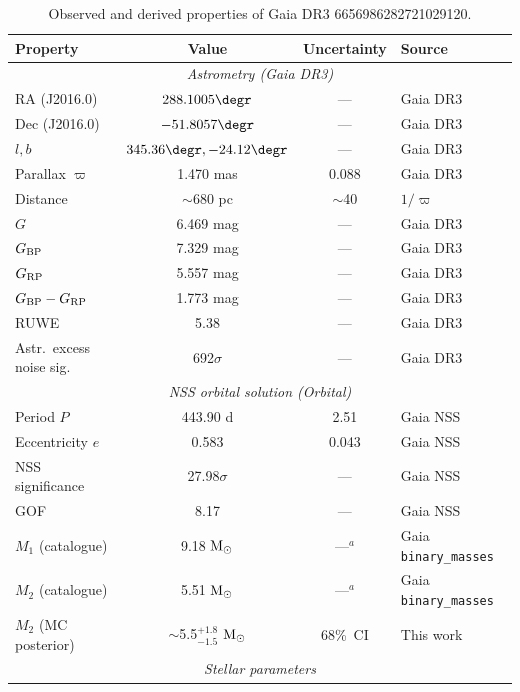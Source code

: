 \documentclass[usenatbib,fleqn]{mnras}
\newcommand{\Msun}{{\rm M}_\odot}
\begin{document}
\begin{table}
\centering
\caption{Observed and derived properties of
Gaia DR3 6656986282721029120.}
\label{tab:observed}
\begin{tabular}{lccl}
\toprule
Property & Value & Uncertainty & Source \\
\midrule
\multicolumn{4}{c}{\textit{Astrometry (Gaia DR3)}} \\
RA (J2016.0)           & $288.1005\degr$      & ---      & Gaia DR3 \\
Dec (J2016.0)          & $-51.8057\degr$      & ---      & Gaia DR3 \\
$l, b$                 & $345.36\degr, -24.12\degr$ & --- & Gaia DR3 \\
Parallax $\varpi$      & 1.470 mas            & 0.088    & Gaia DR3 \\
Distance               & $\sim$680 pc         & $\sim$40 & $1/\varpi$ \\
$G$                    & 6.469 mag            & ---      & Gaia DR3 \\
$G_{\rm BP}$           & 7.329 mag            & ---      & Gaia DR3 \\
$G_{\rm RP}$           & 5.557 mag            & ---      & Gaia DR3 \\
$G_{\rm BP} - G_{\rm RP}$ & 1.773 mag         & ---      & Gaia DR3 \\
RUWE                   & 5.38                 & ---      & Gaia DR3 \\
Astr.\ excess noise sig.\ & 692$\sigma$       & ---      & Gaia DR3 \\
\midrule
\multicolumn{4}{c}{\textit{NSS orbital solution (Orbital)}} \\
Period $P$             & 443.90 d             & 2.51     & Gaia NSS \\
Eccentricity $e$       & 0.583                & 0.043    & Gaia NSS \\
NSS significance       & 27.98$\sigma$        & ---      & Gaia NSS \\
GOF                    & 8.17                 & ---      & Gaia NSS \\
$M_1$ (catalogue)      & 9.18 $\Msun$         & ---$^a$  & Gaia \texttt{binary\_masses} \\
$M_2$ (catalogue)      & 5.51 $\Msun$         & ---$^a$  & Gaia \texttt{binary\_masses} \\
$M_2$ (MC posterior)   & $\sim$5.5$^{+1.8}_{-1.5}$ $\Msun$ & 68\%~CI & This work \\
\midrule
\multicolumn{4}{c}{\textit{Stellar parameters}} \\

\end{tabular}
\end{table}
\end{document}
